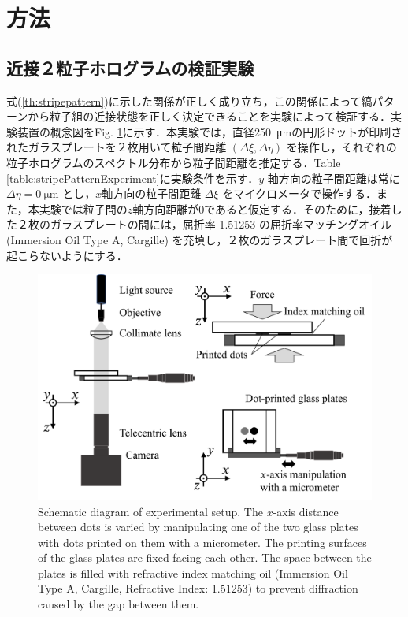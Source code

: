 \section{方法}


\subsection{近接２粒子ホログラムの検証実験}
式(\ref{th:stripepattern})に示した関係が正しく成り立ち，この関係によって縞パターンから粒子組の近接状態を正しく決定できることを実験によって検証する．実験装置の概念図をFig. \ref{fig:stripePatternExperiment}に示す．本実験では，直径\SI{250}{\um}の円形ドットが印刷されたガラスプレートを２枚用いて粒子間距離 $(\Delta \xi, \Delta \eta )$ を操作し，それぞれの粒子ホログラムのスペクトル分布から粒子間距離を推定する．Table \ref{table:stripePatternExperiment}に実験条件を示す．$y$ 軸方向の粒子間距離は常に $\Delta \eta = \SI{0}{\um}$ とし，$x$軸方向の粒子間距離 $\Delta \xi$ をマイクロメータで操作する．また，本実験では粒子間の$z$軸方向距離が\num{0}であると仮定する．そのために，接着した２枚のガラスプレートの間には，屈折率 \num{1.51253} の屈折率マッチングオイル (Immersion Oil Type A, Cargille) を充填し，２枚のガラスプレート間で回折が起こらないようにする． 

\begin{figure}[H]
    \centering
    \includegraphics[width=0.8\linewidth]{./Figure/3_Methods/stripe_pattern_experiment.pdf}
    \caption{Schematic diagram of experimental setup. The $x$-axis distance between dots is varied by manipulating one of the two glass plates with dots printed on them with a micrometer. The printing surfaces of the glass plates are fixed facing each other. The space between the plates is filled with refractive index matching oil (Immersion Oil Type A, Cargille, Refractive Index: 1.51253) to prevent diffraction caused by the gap between them.}
    \label{fig:stripePatternExperiment}
\end{figure}

